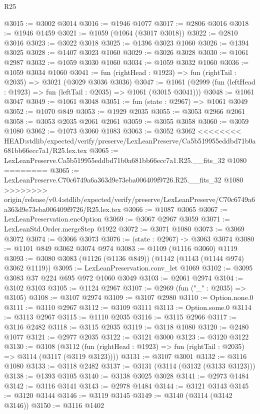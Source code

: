 \begin{lexlean}{R25}
\begin{coremodule}
{{{{{{{{{{{{{{{{{{{{{{{{{{{{{{{{{{{{{{{{{{{{{{{{{{{{{@3015 := @3002 @3014
@3016 := @1946 @1077
@3017 := @2806 @3016
@3018 := @1946 @1459
@3021 := @1059 (@1064 (@3017 @3018))
@3022 := @2810 @3016
@3023 := @3022 @3018
@3025 := @1396 @3023 @1060
@3026 := @1394 @3025
@3028 := @1407 @3023 @1060
@3029 := @3026 @3028
@3030 := @1061 @2987
@3032 := @1059 @3030 @1060
@3034 := @1059 @3032 @1060
@3036 := @1059 @3034 @1060
@3041 := fun (rightHead : @1923) => fun (rightTail : @2035) => @3021 (@3029 @3036 @3036)
@3047 := @1061 (@2999 (fun (leftHead : @1923) => fun (leftTail : @2035) => @1061 (@3015 @3041)))
@3048 := @1061 @3047
@3049 := @1061 @3048
@3051 := fun (state : @2967) => @1061 @3049
@3052 := @1070 @849
@3053 := @1929 @2035
@3055 := @3053 @2966 @2061
@3058 := @3053 @2035 @2061 @2061
@3059 := @3055 @3058
@3060 := @3059 @1080
@3062 := @1073 @3060 @1083
@3063 := @3052 @3062
<<<<<<<< HEAD:stdlib/expected/verify/preserve/LexLeanPreserve/Ca5b519955eddbd71b0a681bb66ecc7a1/R25.lex.tex
@3065 := LexLeanPreserve.Ca5b519955eddbd71b0a681bb66ecc7a1.R25.__fits_32 @1080
========
@3065 := LexLeanPreserve.C70c6749a6a363d9e73eba006409f9726.R25.__fits_32 @1080
>>>>>>>> origin/release/v0.4:stdlib/expected/verify/preserve/LexLeanPreserve/C70c6749a6a363d9e73eba006409f9726/R25.lex.tex
@3066 := @1087 @3065
@3067 := LexLeanPreservation.encOption
@3069 := @3067 @2967 @3059
@3071 := LexLeanStd.Order.mergeStep @1922
@3072 := @3071 @1080
@3073 := @3069 @3072
@3074 := @3066 @3073
@3076 := (state : @2967) -> @3063 @3074
@3080 := @1101 @849 @3062 @3074 @974
@3083 := @1109 (@1116 @3060) @1119
@3093 := @3080 @3083 (@1126 (@1136 @849)) (@1142 (@1143 (@1144 @974) @3062 @1119))
@3095 := LexLeanPreservation.conv_let @1069
@3102 := @3095 @3083 @37 @224 @695 @972 @1060 @3049
@3103 := @2061 @2974
@3104 := @3102 @3103
@3105 := @1124 @2967
@3107 := @2969 (fun ("_" : @2035) => @3105)
@3108 := @3107 @2974
@3109 := @3107 @2980
@3110 := Option.none.{0}
@3111 := @3110 @2967
@3112 := @3109 @3111
@3113 := Option.some.{0}
@3114 := @3113 @2967
@3115 := @1110 @2035
@3116 := @3115 @2966
@3117 := @3116 @2482
@3118 := @3115 @2035
@3119 := @3118 @1080
@3120 := @2480 @1077
@3121 := @2977 @2035
@3122 := @3121 @3000
@3123 := @3120 @3122
@3130 := @3108
    (@3112 (fun (rightHead : @1923) => fun (rightTail : @2035) => @3114 (@3117 (@3119 @3123))))
@3131 := @3107 @3001
@3132 := @3116 @1080
@3133 := @3118 @2482
@3137 := @3131 (@3114 (@3132 (@3133 @3123)))
@3138 := @1393 @3105
@3140 := @3138 @3025 @3028
@3141 := @2973 @1484
@3142 := @3116 @3141
@3143 := @2978 @1484
@3144 := @3121 @3143
@3145 := @3120 @3144
@3146 := @3119 @3145
@3149 := @3140 (@3114 (@3142 @3146))
@3150 := @3116 @1402
}}}}}}}}}}}}}}}}}}}}}}}}}}}}}}}}}}}}}}}}}}}}}}}}}}}}}
\end{coremodule}
\end{lexlean}
